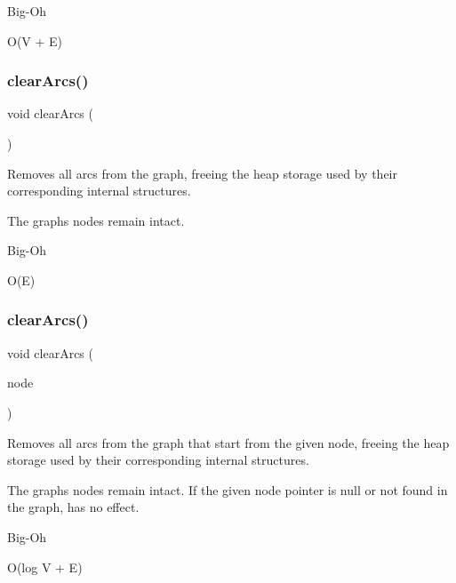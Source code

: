 \begin{DoxyRefDesc}{Big-\/\+Oh}
\item[\mbox{\hyperlink{BigOh__BigOh000049}{Big-\/\+Oh}}]O(V + E) \end{DoxyRefDesc}
\mbox{\label{classGraph_a63f0ce1806df1c8070d997153363eecb}} 
\subsubsection{\texorpdfstring{clear\+Arcs()}{clearArcs()}\hspace{0.1cm}{\footnotesize\ttfamily [1/3]}}
{\footnotesize\ttfamily void clear\+Arcs (\begin{DoxyParamCaption}{ }\end{DoxyParamCaption})}



Removes all arcs from the graph, freeing the heap storage used by their corresponding internal structures. 

The graph\textquotesingle{}s nodes remain intact. \begin{DoxyRefDesc}{Big-\/\+Oh}
\item[\mbox{\hyperlink{BigOh__BigOh000050}{Big-\/\+Oh}}]O(\+E) \end{DoxyRefDesc}
\mbox{\label{classGraph_a14def9e68896088fec7839e5da4fed27}} 
\subsubsection{\texorpdfstring{clear\+Arcs()}{clearArcs()}\hspace{0.1cm}{\footnotesize\ttfamily [2/3]}}
{\footnotesize\ttfamily void clear\+Arcs (\begin{DoxyParamCaption}\item[{Node\+Type $\ast$}]{node }\end{DoxyParamCaption})}



Removes all arcs from the graph that start from the given node, freeing the heap storage used by their corresponding internal structures. 

The graph\textquotesingle{}s nodes remain intact. If the given node pointer is null or not found in the graph, has no effect. \begin{DoxyRefDesc}{Big-\/\+Oh}
\item[\mbox{\hyperlink{BigOh__BigOh000051}{Big-\/\+Oh}}]O(log V + E) \end{DoxyRefDesc}
\mbox{\label{classGraph_a2d8ecb9c6768fff244b2be46319385cc}} 
